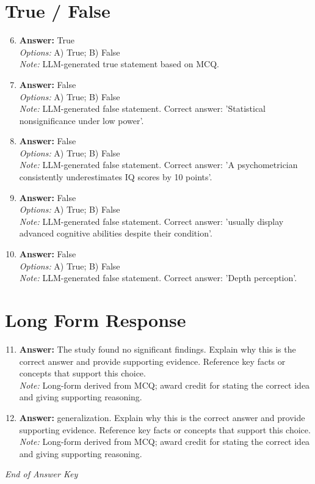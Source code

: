 \documentclass[12pt]{article}
\begin{document}
\section*{True / False}
\begin{enumerate}[label=\arabic*.]
\setcounter{enumi}{5}
\item \textbf{Answer:} True
\\ \textit{Options:} A) True; B) False
\\ \textit{Note:} LLM-generated true statement based on MCQ.
\item \textbf{Answer:} False
\\ \textit{Options:} A) True; B) False
\\ \textit{Note:} LLM-generated false statement. Correct answer: 'Statistical nonsignificance under low power'.
\item \textbf{Answer:} False
\\ \textit{Options:} A) True; B) False
\\ \textit{Note:} LLM-generated false statement. Correct answer: 'A psychometrician consistently underestimates IQ scores by 10 points'.
\item \textbf{Answer:} False
\\ \textit{Options:} A) True; B) False
\\ \textit{Note:} LLM-generated false statement. Correct answer: 'usually display advanced cognitive abilities despite their condition'.
\item \textbf{Answer:} False
\\ \textit{Options:} A) True; B) False
\\ \textit{Note:} LLM-generated false statement. Correct answer: 'Depth perception'.
\end{enumerate}

\section*{Long Form Response}
\begin{enumerate}[label=\arabic*.]
\setcounter{enumi}{10}
\item \textbf{Answer:} The study found no significant findings. Explain why this is the correct answer and provide supporting evidence. Reference key facts or concepts that support this choice.
\\ \textit{Note:} Long-form derived from MCQ; award credit for stating the correct idea and giving supporting reasoning.
\item \textbf{Answer:} generalization. Explain why this is the correct answer and provide supporting evidence. Reference key facts or concepts that support this choice.
\\ \textit{Note:} Long-form derived from MCQ; award credit for stating the correct idea and giving supporting reasoning.
\end{enumerate}

\vfill
\noindent\textit{End of Answer Key}
\end{document}
